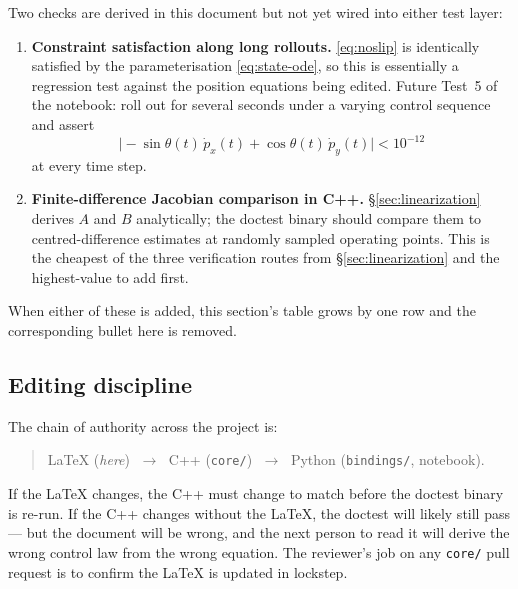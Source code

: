 Two checks are derived in this document but not yet wired into either test layer:

\begin{enumerate}
    \item \textbf{Constraint satisfaction along long rollouts.} \eqref{eq:noslip} is identically satisfied by the parameterisation \eqref{eq:state-ode}, so this is essentially a regression test against the position equations being edited. Future Test~5 of the notebook: roll out for several seconds under a varying control sequence and assert
        \[
            \bigl|-\sin\theta(t)\,\dot p_x(t) + \cos\theta(t)\,\dot p_y(t)\bigr| < 10^{-12}
        \]
        at every time step.
    \item \textbf{Finite-difference Jacobian comparison in C++.} \S\ref{sec:linearization} derives $A$ and $B$ analytically; the doctest binary should compare them to centred-difference estimates at randomly sampled operating points. This is the cheapest of the three verification routes from \S\ref{sec:linearization} and the highest-value to add first.
\end{enumerate}

When either of these is added, this section's table grows by one row and the corresponding bullet here is removed.

\subsection{Editing discipline}

The chain of authority across the project is:
\begin{quote}
    LaTeX (\textit{here}) $\;\longrightarrow\;$ C++ (\texttt{core/}) $\;\longrightarrow\;$ Python (\texttt{bindings/}, notebook).
\end{quote}

If the LaTeX changes, the C++ must change to match before the doctest binary is re-run. If the C++ changes without the LaTeX, the doctest will likely still pass --- but the document will be wrong, and the next person to read it will derive the wrong control law from the wrong equation. The reviewer's job on any \texttt{core/} pull request is to confirm the LaTeX is updated in lockstep.
